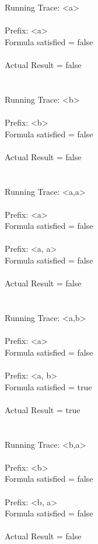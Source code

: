\newpage

\noindent Running Trace: \textless a\textgreater\\
\\
  Prefix: \textless a\textgreater\\
  Formula satisfied = false\\
\\
  Actual Result = false\\
\\
\\
Running Trace: \textless b\textgreater\\
\\
  Prefix: \textless b\textgreater\\
  Formula satisfied = false\\
\\
  Actual Result = false\\
\\
\\
Running Trace: \textless a,a\textgreater\\
\\
  Prefix: \textless a\textgreater\\
  Formula satisfied = false\\
\\
  Prefix: \textless a, a\textgreater\\
  Formula satisfied = false\\
\\
  Actual Result = false\\
\\
\\
Running Trace: \textless a,b\textgreater\\
\\
  Prefix: \textless a\textgreater\\
  Formula satisfied = false\\
\\
  Prefix: \textless a, b\textgreater\\
  Formula satisfied = true\\
\\
  Actual Result = true\\
\\
\\
Running Trace: \textless b,a\textgreater\\
\\
  Prefix: \textless b\textgreater\\
  Formula satisfied = false\\
\\
  Prefix: \textless b, a\textgreater\\
  Formula satisfied = false\\
\\
  Actual Result = false\\

